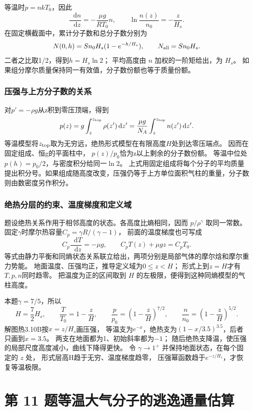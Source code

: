 \documentclass[UTF8,fontset=fandol,a4paper,11pt]{ctexart}
\newcommand{\dd}{\mathop{}\!\mathrm{d}}
\begin{document}
等温时$p=nkT_0$，因此
\[
\frac{\dd n}{\dd z}=-\frac{\mu g}{RT_0}n,\qquad
\ln\frac{n(z)}{n_0}=-\frac z{H_s}.
\]
在固定横截面中，累计分子数和总分子数分别为
\[
N(0,h)=Sn_0H_s(1-e^{-h/H_s}),\qquad
N_{\rm all}=Sn_0H_s.
\]
二者之比取1/2，得到$h=H_s\ln2$；
平均高度由 $n$ 加权的一阶矩给出，为 $H_s$。
如果组分摩尔质量保持同一有效值，分子数份额也等于质量份额。

\subsubsection*{压强与上方分子数的关系}
对$p'=-\rho g$从z积到零压顶端，得到
\[
p(z)=g\int_z^{z_{\rm top}}\rho(z')\dd z'
=\frac{\mu g}{N_A}\int_z^{z_{\rm top}}n(z')\dd z'.
\]
等温模型将$z_{\rm top}$取为无穷远，绝热形式模型在有限高度$H$处到达零压端点。
因而在固定组成、恒g的平面柱中，
$p(z)/p_0$恰为z以上剩余的分子数份额。
等温中位处$p(h)=p_0/2$，与密度积分给同一$\ln2$。
上式用固定组成将每个分子的平均质量提出积分号。如果组成随高度改变，压强仍等于上方单位面积气柱的重量，分子数则由数密度另作积分。

\subsubsection*{绝热分层的约束、温度梯度和定义域}
题设绝热关系作用于相邻高度的状态。各高度比熵相同，因而 $p/\rho^\gamma$ 取同一常数。
固定$\gamma$时摩尔热容量$C_p=\gamma R/(\gamma-1)$，
前面的温度梯度也可写成
\[
C_p\frac{\dd T}{\dd z}=-\mu g,\qquad
C_pT(z)+\mu gz=C_pT_0.
\]
等式由静力平衡和同熵状态关系联立给出，两项分别是局部气体的摩尔焓和摩尔重力势能。
地面温度、压强均正，推导定义域为$0\le z<H$；
形式上到$z=H$才有$T,p,n$同时趋零。
把温度为正的区间取到 $H$ 的左极限，便得到这种同熵模型的气柱高度。

本题$\gamma=7/5$，所以
\[
H=\frac72H_s,\qquad
\frac{T}{T_0}=1-\frac zH,\qquad
\frac p{p_0}=\left(1-\frac zH\right)^{7/2},\qquad
\frac n{n_0}=\left(1-\frac zH\right)^{5/2}.
\]
解图热3.10B按$x=z/H_s$画压强，
等温支为$e^{-x}$，绝热支为$(1-x/3.5)^{3.5}$，后者只画到$x=3.5$。
两支在地面都为1、初始斜率都为$-1$；
随后绝热支降温，使压强的局部尺度高度减小，曲线下降得更快。
令 $\gamma\to1^+$ 并保持地面状态，在每个固定的 $z$ 处，
形式层高H趋于无穷、温度梯度趋零，
压强幂函数趋于$e^{-z/H_s}$，才恢复等温极限。




\section*{第 11 题\quad 等温大气分子的逃逸通量估算}
\end{document}
